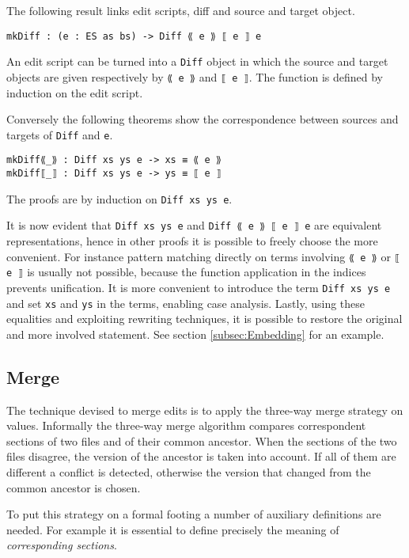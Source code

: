 \documentclass[../Thesis.tex]{subfiles}
\begin{document}
	The following result links edit scripts, diff and source and target object.
	
\begin{verbatim}	
mkDiff : (e : ES as bs) -> Diff ⟪ e ⟫ ⟦ e ⟧ e
\end{verbatim}

	An edit script can be turned into a \texttt{Diff} object in which the
	source and target objects are given respectively by \texttt{⟪ e ⟫} and 
	\texttt{⟦ e ⟧}.
	The function is defined by induction on the edit script.
	
	Conversely the following theorems show the correspondence
	between sources and targets of \texttt{Diff} and \texttt{e}. 

\begin{verbatim}
mkDiff⟪_⟫ : Diff xs ys e -> xs ≡ ⟪ e ⟫
mkDiff⟦_⟧ : Diff xs ys e -> ys ≡ ⟦ e ⟧
\end{verbatim}

	The proofs are by induction on \texttt{Diff xs ys e}.
	
	It is now evident that \texttt{Diff xs ys e} and \texttt{Diff  ⟪ e ⟫ ⟦ e ⟧ e} 
	are equivalent	representations, hence in other proofs it is possible to freely 
	choose the more convenient. 
	For instance pattern matching directly on terms involving \texttt{⟪ e ⟫} or
	\texttt{⟦ e ⟧}	is usually not possible, because the function application
	in the indices prevents unification. 
	It is more convenient to introduce the term
	\texttt{Diff xs ys e} and set \texttt{xs} and \texttt{ys} in the terms, 
	enabling case analysis. Lastly, using 
	these equalities and exploiting rewriting techniques, it is possible
	to restore the original and more involved statement.
	See section \ref{subsec:Embedding} for an example.
	
	\subsection{Merge}	
	\label{subsec:Merge}
	The technique devised to merge edits is to apply the three-way
	merge strategy on values. 
	Informally the three-way merge algorithm compares correspondent sections 
	of two files and of their common ancestor.
	When the sections of the two files disagree, the version of the ancestor
	is taken into account. If all of them are different a conflict is detected,
	otherwise the version that changed from the common ancestor is chosen.
	
	To put this strategy on a formal footing a number of auxiliary definitions 
	are needed. For example it is essential to define precisely the meaning 
	of \emph{corresponding sections}. 
	
\end{document}
